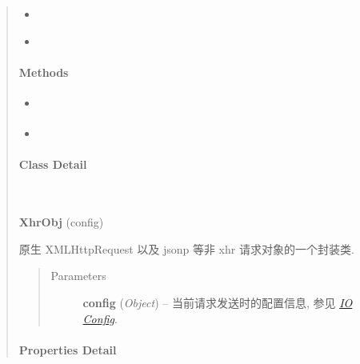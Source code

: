 \documentclass[letterpaper,10pt,english]{sphinxmanual}
\begin{document}
\begin{quote}
\begin{itemize}
\item {}
{\hyperref[api/core/ajax/xhr:io.statusText]{}}

\item {}
{\hyperref[api/core/ajax/xhr:io.responseText]{}}

\end{itemize}


\paragraph{Methods}
\label{api/core/ajax/xhr:methods}\begin{itemize}
\item {}
{\hyperref[api/core/ajax/xhr:io.getResponseHeader]{}}

\item {}
{\hyperref[api/core/ajax/xhr:io.abort]{}}

\end{itemize}


\paragraph{Class Detail}
\label{api/core/ajax/xhr:class-detail}

\begin{fulllineitems}
\label{api/core/ajax/xhr:io.XhrObj}~
\begin{DUlineblock}{0em}
\item[] \textbf{XhrObj} (config)
\item[] 原生 XMLHttpRequest 以及 jsonp 等非 xhr 请求对象的一个封装类.
\end{DUlineblock}
\begin{quote}\begin{description}
\item[{Parameters}] \leavevmode
\textbf{config} (\emph{Object}) -- 当前请求发送时的配置信息, 参见 {\hyperref[api/core/ajax/io:io-config]{\emph{IO Config}}}.

\end{description}\end{quote}

\end{fulllineitems}



\paragraph{Properties Detail}
\label{api/core/ajax/xhr:properties-detail}


\end{quote}
\end{document}
